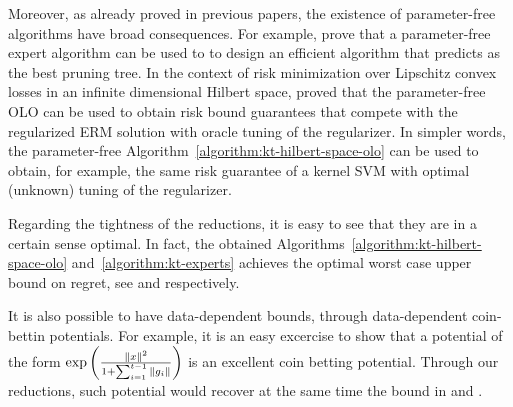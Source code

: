 Moreover, as already proved in previous papers, the existence of parameter-free
algorithms have broad consequences. For example, \citet{LuoS15} prove that a
parameter-free expert algorithm can be used to to design an efficient algorithm
that predicts as the best pruning tree. In the context of risk minimization over
Lipschitz convex losses in an infinite dimensional Hilbert space,
\citet{Orabona14} proved that the parameter-free \ac{OLO} can be used to obtain
risk bound guarantees that compete with the regularized \ac{ERM} solution with
oracle tuning of the regularizer. In simpler words, the parameter-free
Algorithm~\ref{algorithm:kt-hilbert-space-olo} can be used to obtain, for
example, the same risk guarantee of a kernel \ac{SVM} with optimal (unknown)
tuning of the regularizer.

Regarding the tightness of the reductions, it is easy to see that they are in a
certain sense optimal. In fact, the obtained
Algorithms~\ref{algorithm:kt-hilbert-space-olo} and~\ref{algorithm:kt-experts}
achieves the optimal worst case upper bound on regret, see \citet{Orabona13} and
\citet{Cesa-BianchiL06} respectively.

It is also possible to have data-dependent bounds, through data-dependent
coin-bettin potentials. For example, it is an easy excercise to show that a
potential of the form $\exp \left(\frac{\left\|{x}\right\|^2}{1+\sum_{i=1}^{t-1}
\|g_{i}\|}\right)$ is an excellent coin betting potential. Through our
reductions, such potential would recover at the same time the bound in
\citet{LuoS15} and \citet{Orabona14}.
